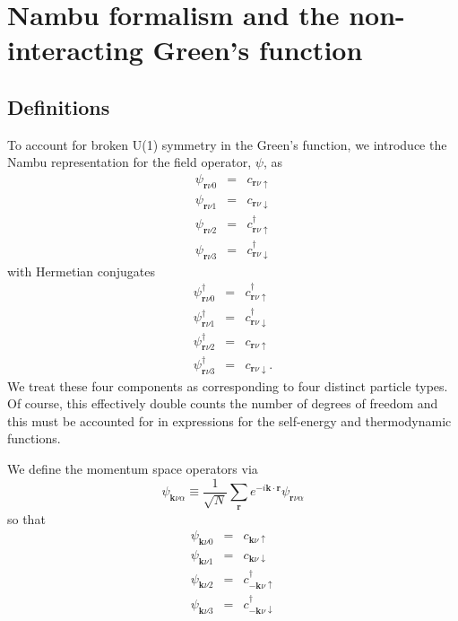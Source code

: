 \chapter{Nambu formalism and the non-interacting Green's function}
\label{chapter:g0}

\section{Definitions}

To account for broken U(1) symmetry in the Green's function, we
introduce the Nambu representation for the field operator, $\psi$, as
\begin{eqnarray}
\psi_{\mathbf{r}\nu 0} & = & c_{\mathbf{r}\nu\uparrow} \\
\psi_{\mathbf{r}\nu 1} & = & c_{\mathbf{r}\nu\downarrow} \\
\psi_{\mathbf{r}\nu 2} & = & c^{\dagger}_{\mathbf{r}\nu\uparrow} \\
\psi_{\mathbf{r}\nu 3} & = & c^{\dagger}_{\mathbf{r}\nu\downarrow} 
\end{eqnarray}
with Hermetian conjugates
\begin{eqnarray}
\psi^{\dagger}_{\mathbf{r}\nu 0} & = & c^{\dagger}_{\mathbf{r}\nu \uparrow} \\
\psi^{\dagger}_{\mathbf{r}\nu 1} & = & c^{\dagger}_{\mathbf{r}\nu \downarrow} \\
\psi^{\dagger}_{\mathbf{r}\nu 2} & = & c_{\mathbf{r}\nu \uparrow} \\
\psi^{\dagger}_{\mathbf{r}\nu 3} & = & c_{\mathbf{r}\nu \downarrow}. 
\end{eqnarray}
We treat these four components as corresponding to
four distinct particle types.  Of course, this
effectively double counts the number of degrees of freedom
and this must be accounted for in expressions for the
self-energy and
thermodynamic functions.

We define the momentum space operators via
\begin{equation}
\psi_{\mathbf{k}\nu\alpha} \equiv
\frac{1}{\sqrt{N}} 
\sum_{\mathbf{r}}
e^{-i \mathbf{k}\cdot \mathbf{r}} \psi_{\mathbf{r}\nu \alpha}
\end{equation}
so that
\begin{eqnarray}
\psi_{\mathbf{k}\nu 0} & = & c_{\mathbf{k}\nu\uparrow} \\
\psi_{\mathbf{k}\nu 1} & = & c_{\mathbf{k}\nu\downarrow} \\
\psi_{\mathbf{k}\nu 2} & = & c^{\dagger}_{-\mathbf{k}\nu\uparrow} \\
\psi_{\mathbf{k}\nu 3} & = & c^{\dagger}_{-\mathbf{k}\nu\downarrow}
\end{eqnarray}

